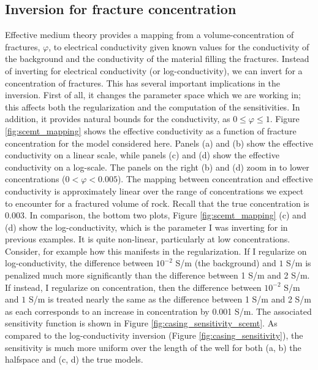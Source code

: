 \subsection{Inversion for fracture concentration}
Effective medium theory provides a mapping from a volume-concentration of fractures, $\varphi$, to electrical conductivity given known values for the conductivity of the background and the conductivity of the material filling the fractures. Instead of inverting for electrical conductivity (or log-conductivity), we can invert for a concentration of fractures. This has several important implications in the inversion. First of all, it changes the parameter space which we are working in; this affects both the regularization and the computation of the sensitivities. In addition, it provides natural bounds for the conductivity, as $0 \leq \varphi \leq 1$. Figure \ref{fig:scemt_mapping} shows the effective conductivity as a function of fracture concentration for the model considered here. Panels (a) and (b) show the effective conductivity on a linear scale, while panels (c) and (d) show the effective conductivity on a log-scale. The panels on the right (b) and (d) zoom in to lower concentrations ($0 < \varphi < 0.005$). The mapping between concentration and effective conductivity is approximately linear over the range of concentrations we expect to encounter for a fractured volume of rock. Recall that the true concentration is 0.003. In comparison, the bottom two plots, Figure \ref{fig:scemt_mapping} (c) and (d) show the log-conductivity, which is the parameter I was inverting for in previous examples. It is quite non-linear, particularly at low concentrations. Consider, for example how this manifests in the regularization. If I regularize on log-conductivity, the difference between $10^{-2}$ S/m (the background) and $1$ S/m is penalized much more significantly than the difference between 1 S/m and 2 S/m. If instead, I regularize on concentration, then the difference between $10^{-2}$ S/m and $1$ S/m is treated nearly the same as the difference between 1 S/m and 2 S/m as each corresponds to an increase in concentration by 0.001 S/m. The associated sensitivity function is shown in Figure \ref{fig:casing_sensitivity_scemt}. As compared to the log-conductivity inversion (Figure \ref{fig:casing_sensitivity}), the sensitivity is much more uniform over the length of the well for both (a, b) the halfspace and (c, d) the true models.






